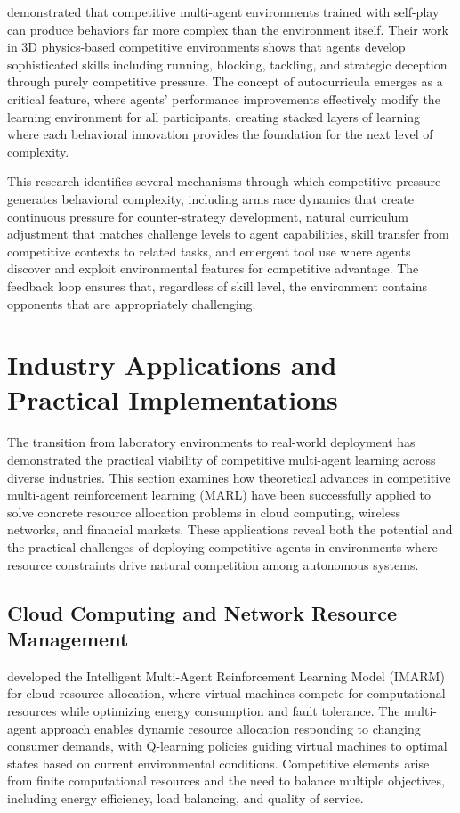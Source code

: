 \textcite{bansal_emergent_2018} demonstrated that competitive multi-agent environments trained with self-play can produce behaviors far more complex than the environment itself. Their work in 3D physics-based competitive environments shows that agents develop sophisticated skills including running, blocking, tackling, and strategic deception through purely competitive pressure. The concept of autocurricula emerges as a critical feature, where agents' performance improvements effectively modify the learning environment for all participants, creating stacked layers of learning where each behavioral innovation provides the foundation for the next level of complexity.

This research identifies several mechanisms through which competitive pressure generates behavioral complexity, including arms race dynamics that create continuous pressure for counter-strategy development, natural curriculum adjustment that matches challenge levels to agent capabilities, skill transfer from competitive contexts to related tasks, and emergent tool use where agents discover and exploit environmental features for competitive advantage. The feedback loop ensures that, regardless of skill level, the environment contains opponents that are appropriately challenging.

\section{Industry Applications and Practical Implementations}

The transition from laboratory environments to real-world deployment has demonstrated the practical viability of competitive multi-agent learning across diverse industries. This section examines how theoretical advances in competitive multi-agent reinforcement learning (MARL) have been successfully applied to solve concrete resource allocation problems in cloud computing, wireless networks, and financial markets. These applications reveal both the potential and the practical challenges of deploying competitive agents in environments where resource constraints drive natural competition among autonomous systems.

\subsection{Cloud Computing and Network Resource Management}

\textcite{belgacem_intelligent_2022} developed the Intelligent Multi-Agent Reinforcement Learning Model (IMARM) for cloud resource allocation, where virtual machines compete for computational resources while optimizing energy consumption and fault tolerance. The multi-agent approach enables dynamic resource allocation responding to changing consumer demands, with Q-learning policies guiding virtual machines to optimal states based on current environmental conditions. Competitive elements arise from finite computational resources and the need to balance multiple objectives, including energy efficiency, load balancing, and quality of service.

